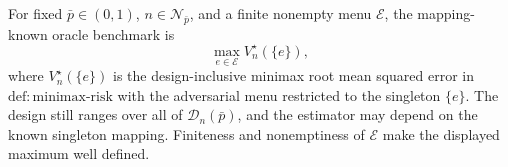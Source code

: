 For fixed \(\bar p\in(0,1)\), \(n\in\mathcal N_{\bar p}\), and a finite nonempty menu \(\mathcal E\), the mapping-known oracle benchmark is
\[
 \max_{e\in\mathcal E}V_n^\star(\{e\}),
\]
where \(V_n^\star(\{e\})\) is the design-inclusive minimax root mean squared error in \(\mathrm{def{:}minimax\text{-}risk}\) with the adversarial menu restricted to the singleton \(\{e\}\).  The design still ranges over all of \(\mathcal D_n(\bar p)\), and the estimator may depend on the known singleton mapping.  Finiteness and nonemptiness of \(\mathcal E\) make the displayed maximum well defined.